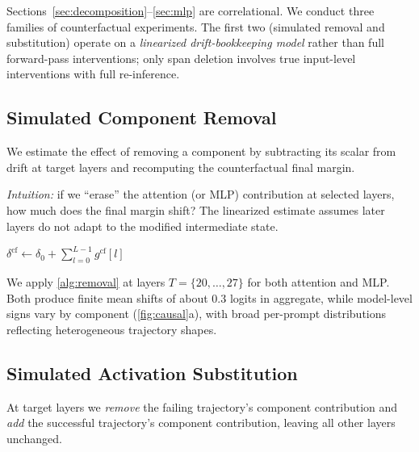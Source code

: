 \documentclass{article}
\begin{document}
Sections~\ref{sec:decomposition}--\ref{sec:mlp} are correlational.  We conduct three families of counterfactual experiments.  The first two (simulated removal and substitution) operate on a \emph{linearized drift-bookkeeping model} rather than full forward-pass interventions; only span deletion involves true input-level interventions with full re-inference.

\subsection{Simulated Component Removal}

We estimate the effect of removing a component by subtracting its scalar from drift at target layers and recomputing the counterfactual final margin.

\emph{Intuition:} if we ``erase'' the attention (or MLP) contribution at selected layers, how much does the final margin shift?  The linearized estimate assumes later layers do not adapt to the modified intermediate state.

\begin{algorithm}[t]
\DontPrintSemicolon
\caption{Simulated Component Removal}\label{alg:removal}
$\delta^{\mathrm{cf}} \leftarrow \delta_0 + \displaystyle\sum_{l=0}^{L-1} g^{\mathrm{cf}}[l]$\;
\;
\end{algorithm}

We apply \cref{alg:removal} at layers $T = \{20, \ldots, 27\}$ for both attention and MLP.  Both produce finite mean shifts of about $0.3$ logits in aggregate, while model-level signs vary by component (\cref{fig:causal}a), with broad per-prompt distributions reflecting heterogeneous trajectory shapes.

\subsection{Simulated Activation Substitution}

At target layers we \emph{remove} the failing trajectory's component contribution and \emph{add} the successful trajectory's component contribution, leaving all other layers unchanged.
\end{document}
